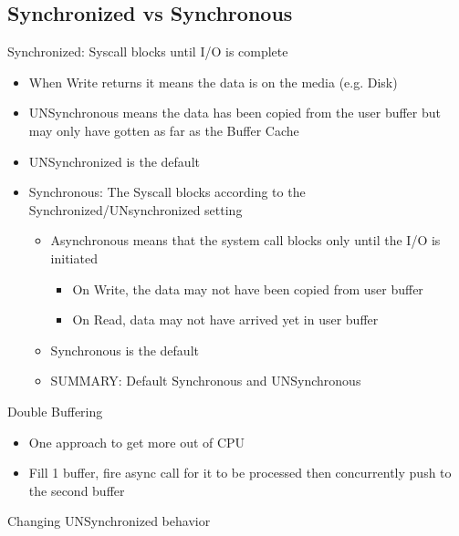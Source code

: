 \subsection{Synchronized vs Synchronous}
Synchronized: Syscall blocks until I/O is complete
\begin{itemize}
    \item When Write returns it means the data is on the media (e.g. Disk)
    \item UNSynchronous means the data has been copied from the user buffer but may only have gotten as far as the Buffer Cache
    \item UNSynchronized is the default
    \item Synchronous: The Syscall blocks according to the Synchronized/UNsynchronized setting
    \begin{itemize}
        \item Asynchronous means that the system call blocks only until the I/O is initiated
        \begin{itemize}
            \item On Write, the data may not have been copied from user buffer
            \item On Read, data may not have arrived yet in user buffer
        \end{itemize}
        \item Synchronous is the default
        \item SUMMARY: Default Synchronous and UNSynchronous
    \end{itemize}
\end{itemize}
Double Buffering
\begin{itemize}
    \item One approach to get more out of CPU
    \item Fill 1 buffer, fire async call for it to be processed then concurrently push to the second buffer
\end{itemize}
Changing UNSynchronized behavior
